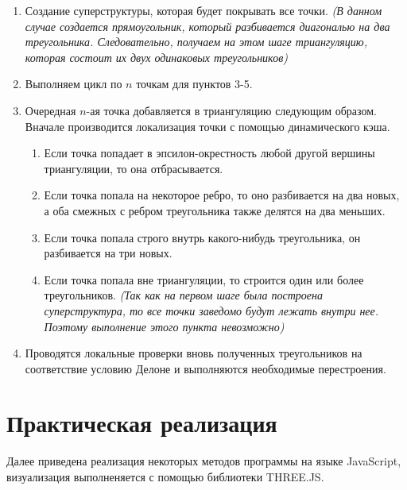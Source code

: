 \documentclass[a4paper, 12pt]{article}   	%
\begin{document}
    \begin{enumerate}
        \item Создание суперструктуры, которая будет покрывать все точки. {\it (В данном случае создается прямоугольник, который разбивается диагональю на два треугольника. Следовательно, получаем на этом шаге триангуляцию, которая состоит их двух одинаковых треугольников)}
        \item Выполняем цикл по $n$ точкам для пунктов 3-5.
        \item Очередная $n$-ая точка добавляется в триангуляцию следующим образом. Вначале производится локализация точки с помощью динамического кэша.
        \begin{enumerate}
            \item Если точка попадает в эпсилон-окрестность любой другой вершины триангуляции, то она отбрасывается.
            \item Если точка попала на некоторое ребро, то оно разбивается на два новых, а оба смежных с ребром треугольника также делятся на два меньших. 
            \item Если точка попала строго внутрь какого-нибудь треугольника, он разбивается на три новых.
            \item Если точка попала вне триангуляции, то строится один или более треугольников.  {\it (Так как на первом шаге была построена суперструктура, то все точки заведомо будут лежать внутри нее. Поэтому выполнение этого пункта невозможно)}
        \end{enumerate}
        \item Проводятся локальные проверки вновь полученных треугольников на соответствие условию Делоне и выполняются необходимые перестроения.
    \end{enumerate}
    
    
\newpage

\section{Практическая реализация}
    Далее приведена реализация некоторых методов программы на языке JavaScript, визуализация выполненяется с помощью библиотеки THREE.JS.
\end{document}
